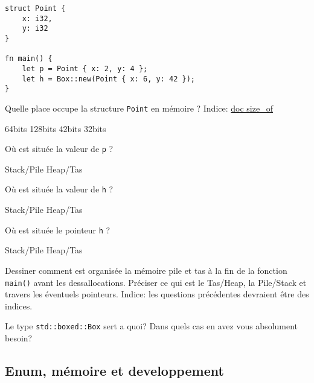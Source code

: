 \documentclass[11pt,a4paper,addpoint,answers]{exam}
\begin{document}
\begin{questions}
\begin{verbatim}
struct Point {
    x: i32,
    y: i32
}

fn main() {
    let p = Point { x: 2, y: 4 };
    let h = Box::new(Point { x: 6, y: 42 });
}
\end{verbatim}

\question[1] Quelle place occupe la structure \texttt{Point} en mémoire ? Indice: \href{https://doc.rust-lang.org/std/mem/fn.size_of.html}{doc size\_of}
    \begin{checkboxes}
        \CorrectChoice 64bits
        \choice 128bits
        \choice 42bits
        \choice 32bits
   \end{checkboxes}

\question[1] Où est située la valeur de \texttt{p} ?
    \begin{checkboxes}
        \CorrectChoice Stack/Pile
        \choice Heap/Tas
   \end{checkboxes}

   \question[1] Où est située la valeur de \texttt{h} ?
    \begin{checkboxes}
        \choice Stack/Pile
        \CorrectChoice Heap/Tas
   \end{checkboxes}

   \question[1] Où est située le pointeur \texttt{h} ?
   \begin{checkboxes}
       \CorrectChoice Stack/Pile
       \choice Heap/Tas
  \end{checkboxes}

  \question[1] Dessiner comment est organisée la mémoire pile et tas à la fin de la fonction \texttt{main()} avant les dessallocations.
  Préciser ce qui est le Tas/Heap, la Pile/Stack et travers les éventuels pointeurs. Indice: les questions précédentes devraient être des
  indices.
  \ifprintanswers
\begin{solution}
\end{solution}
\else
\vspace{2in}
\fi


\question[1] Le type \texttt{std::boxed::Box} sert a quoi? Dans quels cas en avez vous absolument
besoin?
\ifprintanswers
\begin{solution}
\end{solution}
\else
\vspace{2in}
\fi

\subsection{Enum, mémoire et developpement}


\end{questions}
\end{document}

